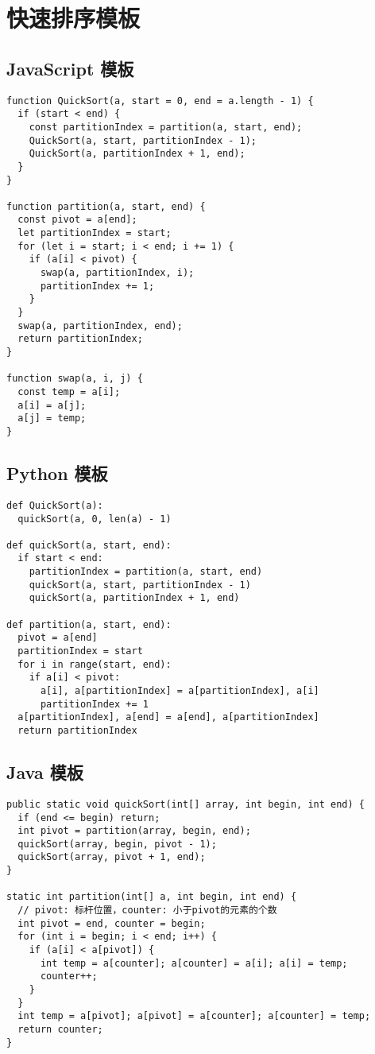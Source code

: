 \newpage
\section{快速排序模板}

\subsection{JavaScript 模板}

\begin{verbatim}
function QuickSort(a, start = 0, end = a.length - 1) {
  if (start < end) {
    const partitionIndex = partition(a, start, end);
    QuickSort(a, start, partitionIndex - 1);
    QuickSort(a, partitionIndex + 1, end);
  }
}

function partition(a, start, end) {
  const pivot = a[end];
  let partitionIndex = start;
  for (let i = start; i < end; i += 1) {
    if (a[i] < pivot) {
      swap(a, partitionIndex, i);
      partitionIndex += 1;
    }
  }
  swap(a, partitionIndex, end);
  return partitionIndex;
}

function swap(a, i, j) {
  const temp = a[i];
  a[i] = a[j];
  a[j] = temp;
}
\end{verbatim}

\subsection{Python 模板}

\begin{verbatim}
def QuickSort(a):
  quickSort(a, 0, len(a) - 1)

def quickSort(a, start, end):
  if start < end:
    partitionIndex = partition(a, start, end)
    quickSort(a, start, partitionIndex - 1)
    quickSort(a, partitionIndex + 1, end)

def partition(a, start, end):
  pivot = a[end]
  partitionIndex = start
  for i in range(start, end):
    if a[i] < pivot:
      a[i], a[partitionIndex] = a[partitionIndex], a[i]
      partitionIndex += 1
  a[partitionIndex], a[end] = a[end], a[partitionIndex]
  return partitionIndex
\end{verbatim}

\subsection{Java 模板}

\begin{verbatim}
public static void quickSort(int[] array, int begin, int end) {
  if (end <= begin) return;
  int pivot = partition(array, begin, end);
  quickSort(array, begin, pivot - 1);
  quickSort(array, pivot + 1, end);
}

static int partition(int[] a, int begin, int end) {
  // pivot: 标杆位置，counter: 小于pivot的元素的个数
  int pivot = end, counter = begin;
  for (int i = begin; i < end; i++) {
    if (a[i] < a[pivot]) {
      int temp = a[counter]; a[counter] = a[i]; a[i] = temp;
      counter++;
    }
  }
  int temp = a[pivot]; a[pivot] = a[counter]; a[counter] = temp;
  return counter;
}
\end{verbatim}
